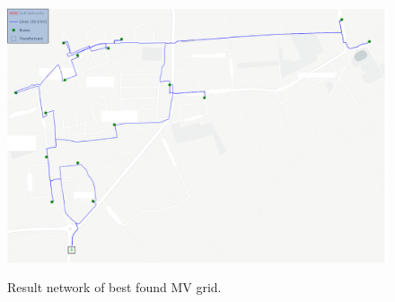 \begin{figure}[h]
	\begin{centering}
		{\includegraphics[scale=0.5]{figures/experiments/1000_iter/pypsa_1000.png}}
		\caption[Result network]{Result network of best found MV grid.}
		\label{fig:pypsa_1000}
	\end{centering}
\end{figure}
